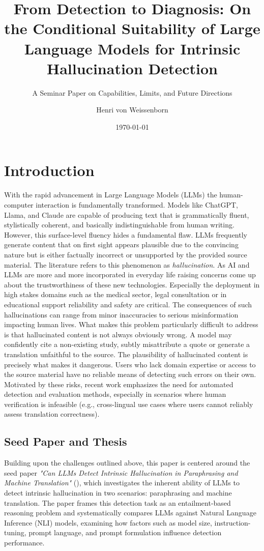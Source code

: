 \documentclass[
  seminar,   	 
  english,   	 
  titlepage=on,
  captions=tableheadings
]{ttlab-qualify}
\author{Henri von Weissenborn}
\title{From Detection to Diagnosis: On the Conditional Suitability of Large Language Models for Intrinsic Hallucination Detection}
\subtitle{A Seminar Paper on Capabilities, Limits, and Future Directions}
\date{\today}
\begin{document}
\maketitle
\tableofcontents
\clearpage
\renewcommand{\thesection}{\arabic{section}}


\section{Introduction}
With the rapid advancement in Large Language Models (LLMs) the human-computer interaction is fundamentally transformed. Models like ChatGPT, Llama, and Claude are capable of producing text that is  grammatically fluent, stylistically coherent, and basically indistinguishable from human writing. However, this surface-level fluency hides a fundamental flaw. LLMs frequently generate content that on first sight appears plausible due to the convincing nature but is either factually incorrect or unsupported by the provided source material. The literature refers to this phenomenon as \textit{hallucination}.
As AI and LLMs are more and more incorporated in everyday life raising concerns come up about the trustworthiness of these new technologies. Especially the deployment in high stakes domains such as the medical sector, legal consultation or in educational support reliability and safety are critical. The consequences of such hallucinations can range from minor inaccuracies to serious misinformation impacting human lives. What makes this problem particularly difficult to address is that hallucinated content is not always obviously wrong. A model may confidently cite a non-existing study, subtly misattribute a quote or generate a translation unfaithful to the source. The plausibility
of hallucinated content is precisely what makes it dangerous. Users who lack domain expertise or access to the source material have no reliable means of detecting such errors on their own. Motivated by these risks, recent work emphasizes the need for automated detection and evaluation methods, especially in scenarios where human verification is infeasible (e.g., cross-lingual use cases where users cannot reliably assess translation correctness).

\subsection{Seed Paper and Thesis}

Building upon the challenges outlined above, this paper is centered around the seed paper \textit{"Can LLMs Detect Intrinsic Hallucination in Paraphrasing and Machine Translation"} (\cite{Gogoulou2025LLMHallucinationDetection}), which investigates the inherent ability of LLMs to detect intrinsic hallucination in two scenarios: paraphrasing and machine translation. The paper frames this detection task as an entailment-based reasoning problem and systematically compares LLMs against Natural Language Inference (NLI) models, examining how factors such as model size, instruction-tuning, prompt language, and prompt formulation influence detection performance.
\end{document}
